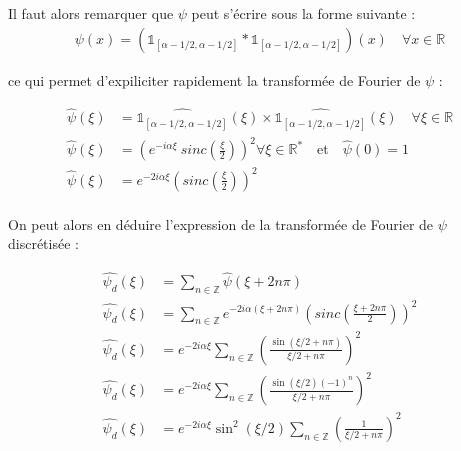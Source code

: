 \documentclass[12pt,a4paper,onecolumn]{article}
\begin{document}
Il faut alors remarquer que \(\psi\) peut s'écrire sous la forme suivante :
\begin{equation*}
	\begin{aligned}
		\psi(x) = \left(\mathds{1}_{[\alpha - 1/2, \alpha - 1/2]} * \mathds{1}_{[\alpha - 1/2, \alpha - 1/2]}\right)(x) \quad \forall x \in \mathbb{R}
	\end{aligned}
\end{equation*}

ce qui permet d'expiliciter rapidement la transformée de Fourier de \(\psi\) :

\begin{equation*}
	\begin{aligned}
		\widehat{\psi}(\xi) & = \widehat{\mathds{1}_{[\alpha - 1/2, \alpha - 1/2]}}(\xi) \times \widehat{\mathds{1}_{[\alpha - 1/2, \alpha - 1/2]}}(\xi) \quad \forall \xi \in \mathbb{R} \\
		\widehat{\psi}(\xi) & = \left(e^{-i\alpha\xi}~sinc\left(\frac{\xi}{2}\right)\right)^2           \forall \xi \in \mathbb{R}^* \quad \text{et} \quad \widehat{\psi}(0) = 1          \\
		\widehat{\psi}(\xi) & = e^{-2i\alpha\xi}\left(sinc\left(\frac{\xi}{2}\right)\right)^2                                                                                             \\
	\end{aligned}
\end{equation*}

On peut alors en déduire l'expression de la transformée de Fourier de \(\psi\) discrétisée :

\begin{equation*}
	\begin{aligned}
		\widehat{\psi_d}(\xi) & = \sum_{n \in \mathbb{Z}}\widehat{\psi}(\xi + 2n\pi)                                                     \\
		\widehat{\psi_d}(\xi) & = \sum_{n \in \mathbb{Z}}e^{-2i\alpha(\xi + 2n\pi)}\left(sinc\left(\frac{\xi + 2n\pi}{2}\right)\right)^2 \\
		\widehat{\psi_d}(\xi) & = e^{-2i\alpha\xi}\sum_{n \in \mathbb{Z}}\left(\frac{\sin(\xi / 2 + n\pi)}{\xi / 2 + n\pi}\right)^2      \\
		\widehat{\psi_d}(\xi) & = e^{-2i\alpha\xi}\sum_{n \in \mathbb{Z}}\left(\frac{\sin(\xi / 2)(-1)^n}{\xi / 2 + n\pi}\right)^2       \\
		\widehat{\psi_d}(\xi) & = e^{-2i\alpha\xi}\sin^2(\xi / 2)\sum_{n \in \mathbb{Z}}\left(\frac{1}{\xi / 2 + n\pi}\right)^2          \\
	\end{aligned}
\end{equation*}
\end{document}
